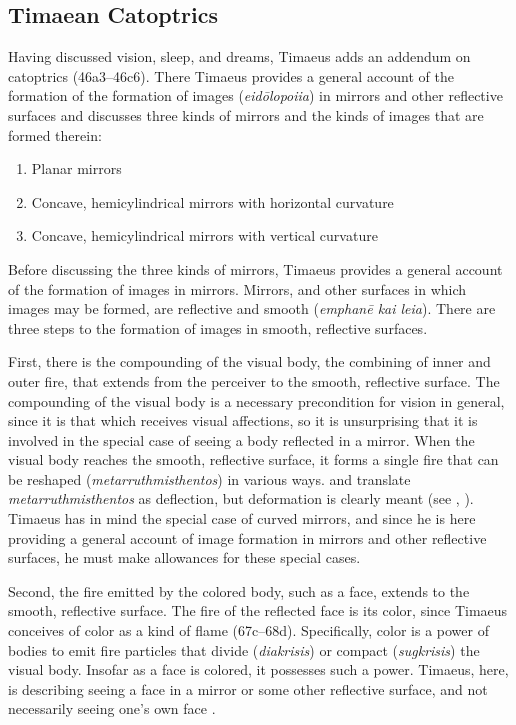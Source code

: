 
\subsection{Timaean Catoptrics} %
\label{sub:timaen_catoptrics}

Having discussed vision, sleep, and dreams, Timaeus adds an addendum on catoptrics (46a3–46c6). There Timaeus provides a general account of the formation of the formation of images (\emph{eidōlopoiia}) in mirrors and other reflective surfaces and discusses three kinds of mirrors and the kinds of images that are formed therein:
\begin{enumerate}
	\item Planar mirrors
	\item Concave, hemicylindrical mirrors with horizontal curvature
	\item Concave, hemicylindrical mirrors with vertical curvature
\end{enumerate}

Before discussing the three kinds of mirrors, Timaeus provides a general account of the formation of images in mirrors. Mirrors, and other surfaces in which images may be formed, are reflective and smooth (\emph{emphanē kai leia}). There are three steps to the formation of images in smooth, reflective surfaces. 

First, there is the compounding of the visual body, the combining of inner and outer fire, that extends from the perceiver to the smooth, reflective surface. The compounding of the visual body is a necessary precondition for vision in general, since it is that which receives visual affections, so it is unsurprising that it is involved in the special case of seeing a body reflected in a mirror. When the visual body reaches the smooth, reflective surface, it forms a single fire that can be reshaped (\emph{metarruthmisthentos}) in various ways. \citet[159]{Archer-Hind:1888qd} and \citet[103]{Bury:1929jb} translate \emph{metarruthmisthentos} as deflection, but deformation is clearly meant (see \citealt[287]{Taylor:1928qb}, \citealt[154]{Cornford:1935fk}). Timaeus has in mind the special case of curved mirrors, and since he is here providing a general account of image formation in mirrors and other reflective surfaces, he must make allowances for these special cases. 

Second, the fire emitted by the colored body, such as a face, extends to the smooth, reflective surface. The fire of the reflected face is its color, since Timaeus conceives of color as a kind of flame (67c–68d). Specifically, color is a power of bodies to emit fire particles that divide (\emph{diakrisis}) or compact (\emph{sugkrisis}) the visual body. Insofar as a face is colored, it possesses such a power. Timaeus, here, is describing seeing a face in a mirror or some other reflective surface, and not necessarily seeing one's own face \citep[286--7]{Taylor:1928qb}. 

